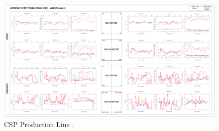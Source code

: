 \begin{landscape}
\begin{figure}[ht]
	\centering
	\hspace*{-1.3cm}
	\captionsetup{width=1.1\linewidth}
	\includegraphics[width=1.6\textwidth]{../images/supplements-CSP_real_life_events_analysis-results-curves_and_time_resolutions.png}
	\caption{CSP Production Line \cc{} \dd{}.}
	\label{figure-supplements-CSP-curveplots_sliding}
\end{figure}
\end{landscape}